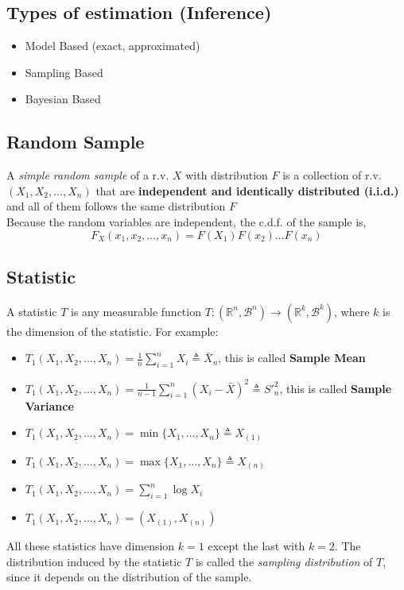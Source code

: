 \subsection{Types of estimation (Inference)}
\begin{itemize}
    \item Model Based (exact, approximated)
    \item Sampling Based
    \item Bayesian Based
\end{itemize}

\subsection{Random Sample}
A \textit{simple random sample} of a r.v. $X$ with distribution $F$ is a
collection of r.v. $(X_1, X_2,\dots,X_n)$ that are \textbf{independent and
identically distributed (i.i.d.)} and all of them follows the same distribution
$F$\\

Because the random variables are independent, the c.d.f. of the sample is,
\[ F_X(x_1,x_2,\dots,x_n) = F(X_1)F(x_2)\dots F(x_n) \]

\subsection{Statistic}
A statistic $T$ is any measurable function $T: (\mathbb{R}^n,\mathcal{B}^n)
\rightarrow (\mathbb{R}^k,\mathcal{B}^k)$, where $k$ is the dimension of the
statistic. For example:
\begin{itemize}
    \item $T_1(X_1,X_2,\dots,X_n) = \frac{1}{n}\sum_{i=1}^{n}X_i \triangleq \bar{X}_n$, this is called \textbf{Sample Mean}
    \item $T_1(X_1,X_2,\dots,X_n) = \frac{1}{n-1}\sum_{i=1}^{n} (X_i-\bar{X})^2 \triangleq S'^2_n$, this is called \textbf{Sample Variance}
    \item $T_1(X_1,X_2,\dots,X_n) = \min \{ X_1,\dots,X_n \} \triangleq X_{(1)}$
    \item $T_1(X_1,X_2,\dots,X_n) = \max \{ X_1,\dots,X_n \} \triangleq X_{(n)}$
    \item $T_1(X_1,X_2,\dots,X_n) = \sum_{i=1}^{n} \log{X_i}$
    \item $T_1(X_1,X_2,\dots,X_n) = (X_{(1)}, X_{(n)})$
\end{itemize} 
All these statistics have dimension $k=1$ except the last with $k=2$. The
distribution induced by the statistic $T$ is called the \textit{sampling
distribution} of $T$, since it depends on the distribution of the sample.

